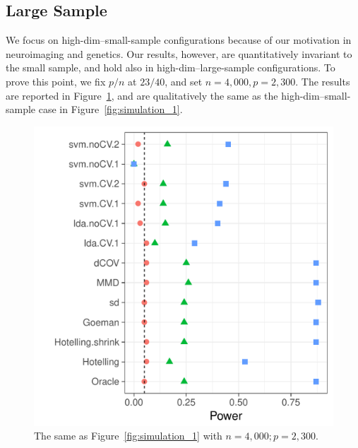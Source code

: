 \documentclass[journal]{IEEEtran}
\begin{document}
\subsection{Large Sample}
\label{sec:large-sample}

We focus on high-dim--small-sample configurations because of our motivation in neuroimaging and genetics. 
Our results, however, are quantitatively invariant to the small sample, and hold also in high-dim--large-sample configurations.
To prove this point, we fix $p/n$ at $23/40$, and set $n=4,000, p=2,300$. 
The results are reported in Figure~\ref{fig:large-sample}, and are qualitatively the same as the high-dim--small-sample case in Figure~\ref{fig:simulation_1}.


\begin{figure}[h]
	\centering
	\includegraphics[width=0.7\columnwidth]{"art/file1"}
	\caption{The same as Figure~\ref{fig:simulation_1} with $n=4,000; p=2,300$.}
	\label{fig:large-sample}
\end{figure}
\end{document}
